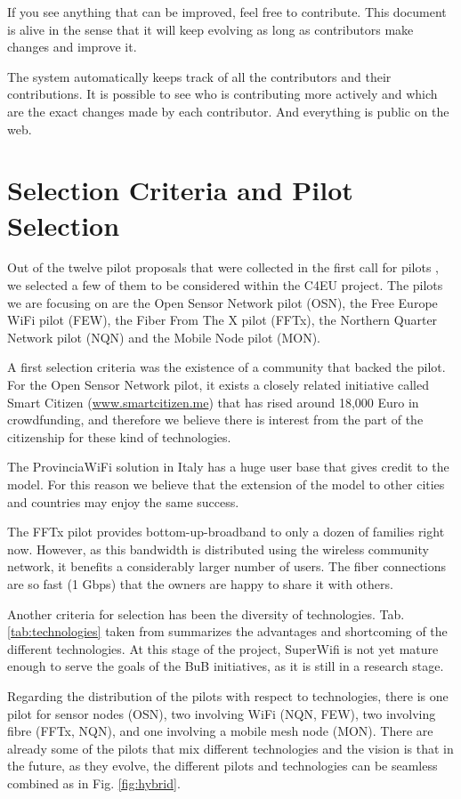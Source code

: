 \documentclass[draftclsnofoot,12pt,journal,onecolumn]{IEEEtran}
\begin{document}
If you see anything that can be improved, feel free to contribute.
This document is alive in the sense that it will keep evolving as long as contributors make changes and improve it.

The system automatically keeps track of all the contributors and their contributions. 
It is possible to see who is contributing more actively and which are the exact changes made by each contributor.
And everything is public on the web.

\section{Selection Criteria and Pilot Selection}
\label{sec:selection}

Out of the twelve pilot proposals that were collected in the first call for pilots \cite{barcelo2012bub}, we selected a few of them to be considered within the C4EU project.
The pilots we are focusing on are the Open Sensor Network pilot (OSN), the Free Europe WiFi pilot (FEW), the Fiber From The X pilot (FFTx), the Northern Quarter Network pilot (NQN) and the Mobile Node pilot (MON).

A first selection criteria was the existence of a community that backed the pilot.
For the Open Sensor Network pilot, it exists a closely related initiative called Smart Citizen (\url{www.smartcitizen.me}) that has rised around 18,000 Euro in crowdfunding, and therefore we believe there is interest from the part of the citizenship for these kind of technologies.

The ProvinciaWiFi solution in Italy has a huge user base that gives credit to the model.
For this reason we believe that the extension of the model to other cities and countries may enjoy the same success.

The FFTx pilot provides bottom-up-broadband to only a dozen of families right now.
However, as this bandwidth is distributed using the wireless community network, it benefits a considerably larger number of users.
The fiber connections are so fast (1 Gbps) that the owners are happy to share it with others.

Another criteria for selection has been the diversity of technologies.
Tab. \ref{tab:technologies} taken from \cite{barcelo2012bub} summarizes the advantages and shortcoming of the different technologies.
At this stage of the project, SuperWifi is not yet mature enough to serve the goals of the BuB initiatives, as it is still in a research stage.

Regarding the distribution of the pilots with respect to technologies, there is one pilot for sensor nodes (OSN), two involving WiFi (NQN, FEW), two involving fibre (FFTx, NQN), and one involving a mobile mesh node (MON).
There are already some of the pilots that mix different technologies and the vision is that in the future, as they evolve, the different pilots and technologies can be seamless combined as in Fig. \ref{fig:hybrid}.
\end{document}

